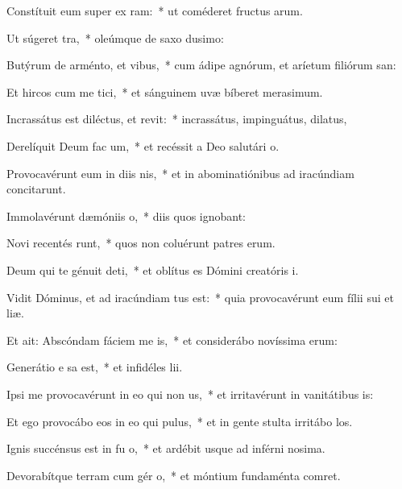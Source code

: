\item Constítuit eum super ex ram:~* ut coméderet fructus arum.
\item Ut súgeret   tra,~* oleúmque de saxo dusimo:
\item Butýrum de arménto, et   vibus,~* cum ádipe agnórum, et aríetum filiórum san:
\item Et hircos cum me tici,~* et sánguinem uvæ bíberet merasimum.
\item Incrassátus est diléctus, et revit:~* incrassátus, impinguátus, dilatus,
\item Derelíquit Deum fac um,~* et recéssit a Deo salutári o.
\item Provocavérunt eum in diis nis,~* et in abominatiónibus ad iracúndiam concitarunt.
\item Immolavérunt dæmóniis   o,~* diis quos ignobant:
\item Novi recentés runt,~* quos non coluérunt patres erum.
\item Deum qui te génuit deti,~* et oblítus es Dómini creatóris i.
\item \singlecolsep
\item Vidit Dóminus, et ad iracúndiam tus est:~* quia provocavérunt eum fílii sui et liæ.
\item Et ait: Abscóndam fáciem me  is,~* et considerábo novíssima erum:
\item Generátio e sa est,~* et infidéles lii.
\item Ipsi me provocavérunt in eo qui non  us,~* et irritavérunt in vanitátibus is:
\item Et ego provocábo eos in eo qui   pulus,~* et in gente stulta irritábo los.
\item Ignis succénsus est in fu o,~* et ardébit usque ad inférni nosima.
\item Devorabítque terram cum gér o,~* et móntium fundaménta comret.
